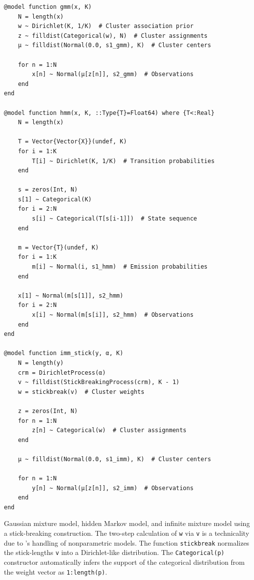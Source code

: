 \begin{lstfloat}[p]
\begin{lstlisting}[style=lstfloat]
@model function gmm(x, K)
    N = length(x)
    w ~ Dirichlet(K, 1/K)  # Cluster association prior
    z ~ filldist(Categorical(w), N)  # Cluster assignments
    μ ~ filldist(Normal(0.0, s1_gmm), K)  # Cluster centers

    for n = 1:N
        x[n] ~ Normal(μ[z[n]], s2_gmm)  # Observations
    end
end

@model function hmm(x, K, ::Type{T}=Float64) where {T<:Real}
    N = length(x)

    T = Vector{Vector{X}}(undef, K)
    for i = 1:K
        T[i] ~ Dirichlet(K, 1/K)  # Transition probabilities
    end
    
    s = zeros(Int, N)
    s[1] ~ Categorical(K)
    for i = 2:N
        s[i] ~ Categorical(T[s[i-1]])  # State sequence
    end
    
    m = Vector{T}(undef, K)
    for i = 1:K
        m[i] ~ Normal(i, s1_hmm)  # Emission probabilities
    end
    
    x[1] ~ Normal(m[s[1]], s2_hmm)
    for i = 2:N
        x[i] ~ Normal(m[s[i]], s2_hmm)  # Observations
    end
end

@model function imm_stick(y, α, K)
    N = length(y)
    crm = DirichletProcess(α)
    v ~ filldist(StickBreakingProcess(crm), K - 1)
    w = stickbreak(v)  # Cluster weights
    
    z = zeros(Int, N)
    for n = 1:N
        z[n] ~ Categorical(w)  # Cluster assignments
    end

    μ ~ filldist(Normal(0.0, s1_imm), K)  # Cluster centers

    for n = 1:N
        y[n] ~ Normal(μ[z[n]], s2_imm)  # Observations
    end
end
\end{lstlisting}
  \caption{Gaussian mixture model, hidden Markov model, and infinite mixture model using a
    stick-breaking construction.  The two-step calculation of \texttt{w} via \texttt{v} is a
    technicality due to \turingjl{}'s handling of nonparametric models.  The function
    \texttt{stickbreak} normalizes the stick-lengths \texttt{v} into a Dirichlet-like distribution.
    The \texttt{Categorical(p)} constructor automatically infers the support of the categorical
    distribution from the weight vector as \texttt{1:length(p)}.}
  \label{lst:evaluation-models}
\end{lstfloat}

\cleartoverso
\FloatBlock

